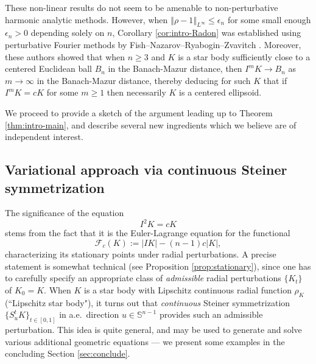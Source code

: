 \documentclass[11pt]{article}
\theoremstyle{definition}
\theoremstyle{proof}
\DeclareMathOperator{\+}{\mathop{\tilde{+}}}
\newcommand{\norm}[1]{\left\Vert#1\right\Vert}
\renewcommand{\S}{\mathbb{S}}
\newcommand{\F}{\mathcal{F}}
\newcommand{\eps}{\epsilon}
\numberwithin{equation}{section}
\numberwithin{equation}{section}
\begin{document}
These non-linear results do not seem to be amenable to non-perturbative harmonic analytic methods. However, when $\norm{\rho-1}_{L^\infty} \leq \eps_n$ for some small enough $\eps_n > 0$ depending solely on $n$, Corollary \ref{cor:intro-Radon} was established using perturbative Fourier methods by Fish--Nazarov--Ryabogin--Zvavitch \cite{FNRZ-IntersectionBodyOperator}. Moreover, these authors showed that when $n \geq 3$ and $K$ is a star body sufficiently close to a centered Euclidean ball $B_n$ in the Banach-Mazur distance, then $I^m K \rightarrow B_n$ as $m \rightarrow \infty$ in the Banach-Mazur distance, thereby deducing for such $K$ that if $I^m K = c K$ for some $m \geq 1$ then necessarily $K$ is a centered ellipsoid. 
\smallskip

We proceed to provide a sketch of the argument leading up to Theorem \ref{thm:intro-main}, and describe several new ingredients which we believe are of independent interest. 

\subsection{Variational approach via continuous Steiner symmetrization}

The significance of the equation 
\begin{equation} \label{eq:intro-I2K}
I^2 K = c K
\end{equation}
stems from the fact that it is the Euler-Lagrange equation for the functional
\begin{equation} \label{eq:intro-F}
\F_c(K) := |I K| - (n-1) c |K| ,
\end{equation}
characterizing its stationary points under radial perturbations. 
A precise statement is somewhat technical (see Proposition \ref{prop:stationary}), since one has to carefully specify an appropriate class of \emph{admissible} radial perturbations $\{K_t\}$ of $K_0 = K$. When $K$ is a star body with Lipschitz continuous radial function $\rho_K$ (``Lipschitz star body"), it turns out that \emph{continuous} Steiner symmetrization $\{S_u^t K\}_{t \in [0,1]}$ in a.e.~direction $u \in \S^{n-1}$ provides such an admissible perturbation. This idea is quite general, and may be used to generate and solve various additional geometric equations --- we present some examples in the concluding Section \ref{sec:conclude}. 

\smallskip
\end{document}
